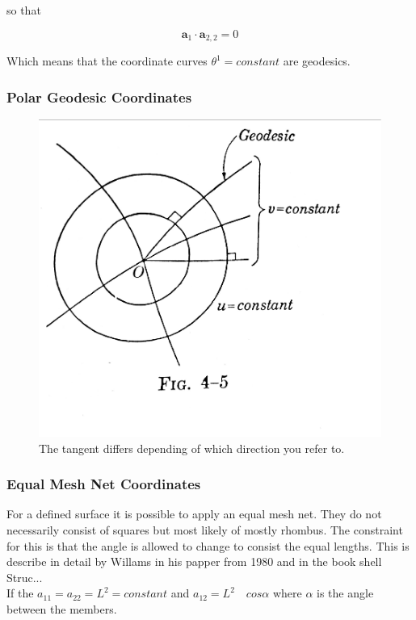 so that

\begin{equation}
\textbf{a}_1 \cdot \textbf{a}_{2,2} = 0
\end{equation}

Which means that the coordinate curves $\theta^1 = constant$ are geodesics. 


\subsubsection{Polar Geodesic Coordinates}

\begin{figure}[H]
\centering
\includegraphics[height=0.5\linewidth ]{figure/Theory/polarGeodesicCoordMod.pdf}
\caption{The tangent differs depending of which direction you refer to. }
\end{figure}


\subsubsection{Equal Mesh Net Coordinates}

For a defined surface it is possible to apply an equal mesh net. They do not necessarily consist of squares but most likely of mostly rhombus. The constraint for this is that the angle is allowed to change to consist the equal lengths. This is describe in detail by Willams in his papper from 1980 and in the book shell Struc...\\
If the $a_{11} = a_{22} = L^2 = constant$ and $a_{12} = L^2\quad cos\alpha$ where $\alpha$ is the angle between the members.\\

